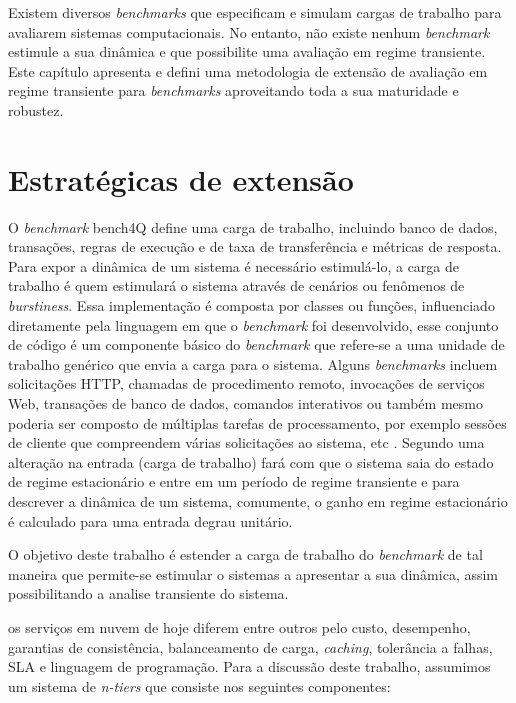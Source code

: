 Existem diversos \textit{benchmarks} que especificam e simulam cargas de trabalho para avaliarem sistemas computacionais. No entanto, não existe nenhum \textit{benchmark} estimule a sua dinâmica e que possibilite uma avaliação em regime transiente. Este capítulo apresenta e defini uma metodologia de extensão de avaliação em regime transiente para \textit{benchmarks} aproveitando toda a sua maturidade e robustez.

\section{Estratégicas de extensão}

O \textit{benchmark} bench4Q define uma carga de trabalho, incluindo banco de dados, transações, regras de execução e de taxa de transferência e métricas de resposta.  Para expor a dinâmica de um sistema é necessário estimulá-lo, a carga de trabalho é quem estimulará o sistema através de cenários ou fenômenos de \textit{burstiness}. Essa implementação é composta por classes ou funções, influenciado diretamente pela linguagem em que o \textit{benchmark} foi desenvolvido, esse conjunto de código é um componente básico do \textit{benchmark} que refere-se a uma unidade de trabalho genérico que envia a carga para o sistema. Alguns \textit{benchmarks} incluem solicitações HTTP, chamadas de procedimento remoto, invocações de serviços Web, transações de banco de dados, comandos interativos ou também mesmo poderia ser composto de múltiplas tarefas de processamento, por exemplo sessões de cliente que compreendem várias solicitações ao sistema, etc \cite{Kounev2005}. Segundo \cite{Nobile2013} uma alteração na entrada (carga de trabalho) fará com que o sistema saia do estado de regime estacionário e entre em um período de regime transiente e para descrever a dinâmica de um sistema, comumente, o ganho em regime estacionário é calculado para uma entrada degrau unitário.

O objetivo deste trabalho é estender a carga de trabalho do \textit{benchmark} de tal maneira que permite-se estimular o sistemas a apresentar a sua dinâmica, assim possibilitando a analise transiente do sistema. 


\cite{Binnig2009} os serviços em nuvem de hoje diferem entre outros pelo custo, desempenho, garantias de consistência, balanceamento de carga, \textit{caching}, tolerância a falhas, SLA e linguagem de programação. Para a discussão deste trabalho, assumimos um sistema de \textit{n-tiers} que consiste nos seguintes componentes:

